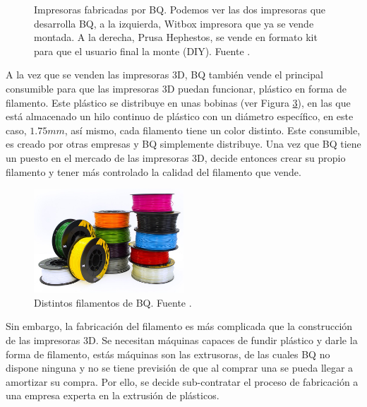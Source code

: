 \begin{figure}[!h]
\begin{subfigure}[b]{0.3\textwidth}
        \label{fig:estado_hephestos}
    \end{subfigure}
    \caption[Impresoras fabricadas por BQ.]{Impresoras fabricadas por BQ. Podemos ver las dos impresoras que desarrolla BQ, a la izquierda, Witbox impresora que ya se vende montada. A la derecha, Prusa Hephestos, se vende en formato kit para que el usuario final la monte (DIY). Fuente \cite{bq}.}
    \label{fig:impresoras_bq}
\end{figure}

A la vez que se venden las impresoras 3D, BQ también vende el principal consumible para que las impresoras 3D puedan funcionar, plástico en forma de filamento. Este plástico se distribuye en unas bobinas (ver Figura \ref{fig:estado_filamento}), en las que está almacenado un hilo continuo de plástico con un diámetro específico, en este caso, $1.75mm$, así mismo, cada filamento tiene un color distinto. Este consumible, es creado por otras empresas y BQ simplemente distribuye. Una vez que BQ tiene un puesto en el mercado de las impresoras 3D, decide entonces crear su propio filamento y tener más controlado la calidad del filamento que vende.\\

\begin{figure}[!ht]
    \centering
    \includegraphics[width=0.5\textwidth]{images/filamento_bq.png}
    \caption[Distintos filamentos de BQ.]{Distintos filamentos de BQ. Fuente \cite{bq}.}
    \label{fig:estado_filamento}
\end{figure}

Sin embargo, la fabricación del filamento es más complicada que la construcción de las impresoras 3D. Se necesitan máquinas capaces de fundir plástico y darle la forma de filamento, estás máquinas son las extrusoras, de las cuales BQ no dispone ninguna y no se tiene previsión de que al comprar una se pueda llegar a amortizar su compra. Por ello, se decide sub-contratar el proceso de fabricación a una empresa experta en la extrusión de plásticos.\\

